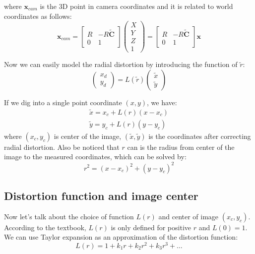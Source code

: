 \documentclass[conference]{IEEEtran}
\newcommand{\mat}[1]{\mathbf{#1}} %
\begin{document}
where $\mat{x}_{cam}$ is the 3D point in camera coordinates and it is related to world coordinates as follows:
\begin{equation}
	\mat{x}_{cam} = \begin{bmatrix}
				R & -R\tilde{\mat{C}}\\
				0 & 1
			\end{bmatrix}
			\begin{pmatrix}
				X\\
				Y\\
				Z\\
				1
			\end{pmatrix}
			=\begin{bmatrix}
				R & -R\tilde{\mat{C}}\\
				0 & 1
			\end{bmatrix}\mat{x}
\end{equation}

Now we can easily model the radial distortion by introducing the function of $\tilde{r}$:
\begin{equation}
	\begin{pmatrix}
		x_d\\
		y_d
	\end{pmatrix}
	=L(\tilde{r})\begin{pmatrix}
		\tilde{x}\\
		\tilde{y}
	\end{pmatrix}
\end{equation}

If we dig into a single point coordinate $(x, y)$, we have:
\begin{equation}
\begin{split}
	\tilde{x} = x_c + L(r)(x-x_c)\\
	\tilde{y} = y_c + L(r)(y-y_c)
\end{split}
\end{equation}
where $(x_c, y_c)$ is center of the image, $(\tilde{x}, \tilde{y})$ is the coordinates after correcting radial distortion. Also be noticed that $r$ can is the radius from center of the image to the measured coordinates, which can be solved by:
\begin{equation}
	r^2 = (x-x_c)^2 + (y-y_c)^2
\end{equation}

\subsection{Distortion function and image center}
Now let's talk about the choice of function $L(r)$ and center of image $(x_c, y_c)$. According to the textbook, $L(r)$ is only defined for positive $r$ and $L(0) = 1$. We can use Taylor expansion as an approximation of the distortion function:
\begin{equation}
	L(r) = 1 + k_1r + k_2r^2 + k_3r^3 + \dots
\end{equation}
\end{document}
